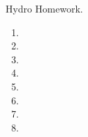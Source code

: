 \documentclass[12pt,preprint]{aastex}  %
\begin{document}
Hydro Homework.

\begin{enumerate}
\item
\item
\item
\item
\item
\item
\item
\item 
\end{enumerate}
\end{document}
